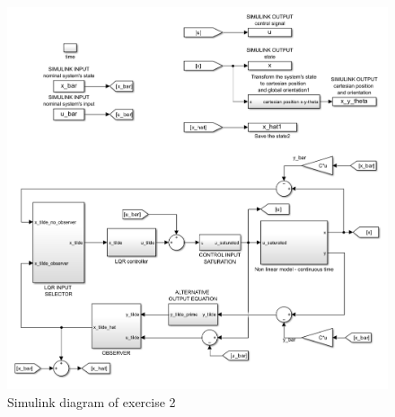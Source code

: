 \begin{figure}[H]
    \centering
    \includegraphics[width = 0.8\linewidth]{Latex report/image/ex2Simulink.png}
    \caption{Simulink diagram of exercise 2}
    \label{fig:ex2Simulink}
\end{figure}


